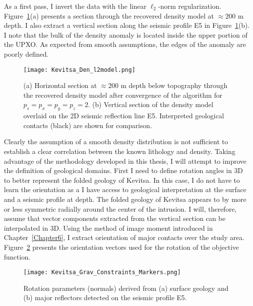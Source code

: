 As a first pass, I invert the data with the linear $\ell_2$-norm regularization.
Figure~\ref{Kevitsa_Den_l2model}(a) presents a section through the recovered density model at $\approx 200$ m depth. I also extract a vertical section along the seismic profile E5 in Figure~\ref{Kevitsa_Den_l2model}(b). I note that the bulk of the density anomaly is located inside the upper portion of the UPXO. As expected from smooth assumptions, the edges of the anomaly are poorly defined.
\begin{figure}
\texttt{[image: Kevitsa\_Den\_l2model.png]}
\caption{(a) Horizontal section at $\approx 200$ m depth below topography through the recovered density model after convergence of the algorithm for $p_s=p_x=p_y=p_z=2$. (b) Vertical section of the density model overlaid on the 2D seismic reflection line E5. Interpreted geological contacts (black) are shown for comparison.}
\label{Kevitsa_Den_l2model}
\end{figure}

Clearly the assumption of a smooth density distribution is not sufficient to establish a clear correlation between the known lithology and density.
Taking advantage of the methodology developed in this thesis, I will attempt to improve the definition of geological domains. First I need to define rotation angles in 3D to better represent the folded geology of Kevitsa. In this case, I do not have to learn the orientation as a I have access to geological interpretation at the surface and a seismic profile at depth. 
The folded geology of Kevitsa appears to by more or less symmetric radially around the center of the intrusion. I will, therefore, assume that vector components extracted from the vertical section can be interpolated in 3D.
Using the method of image moment introduced in Chapter~\ref{Chapter6}, I extract orientation of major contacts over the study area. Figure~\ref{Kevitsa_Fold_ROT_l2Model} presents the orientation vectors used for the rotation of the objective function.
\begin{figure}[h!]
\centering
\texttt{[image: Kevitsa\_Grav\_Constraints\_Markers.png]}
\caption{Rotation parameters (normals) derived from (a) surface geology and (b) major reflectors detected on the seismic profile E5.}
\label{Kevitsa_Fold_ROT_l2Model}
\end{figure}

